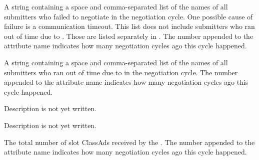 \begin{description}

\label{attr:LastNegotiationCycleSubmittersFailed<X>}
\item[\AdAttr{LastNegotiationCycleSubmittersFailed<X>}:] A string containing
  a space and comma-separated list of the names of all submitters who
  failed to negotiate in the negotiation cycle.  One possible cause of
  failure is a communication timeout.  This list does not include
  submitters who ran out of time due
  to .  Those are listed
  separately in .
  The number  appended to the attribute name indicates how
  many negotiation cycles ago this cycle happened.

\label{attr:LastNegotiationCycleSubmittersOutOfTime<X>}
\item[\AdAttr{LastNegotiationCycleSubmittersOutOfTime<X>}:] A string containing
  a space and comma-separated list of the names of all submitters who
  ran out of time due to 
  in the negotiation cycle.  The number  appended to the
  attribute name indicates how many negotiation cycles ago this cycle
  happened.

\label{attr:LastNegotiationCycleSubmittersShareLimit}
\item[\AdAttr{LastNegotiationCycleSubmittersShareLimit}:] 
Description is not yet written.

\label{attr:LastNegotiationCycleTime}
\item[\AdAttr{LastNegotiationCycleTime}:] 
Description is not yet written.

\label{attr:LastNegotiationCycleTotalSlots<X>}
\item[\AdAttr{LastNegotiationCycleTotalSlots<X>}:] 
The total number of slot ClassAds received by the .
The number  appended to the attribute name indicates 
how many negotiation cycles ago this cycle happened.


\end{description}
